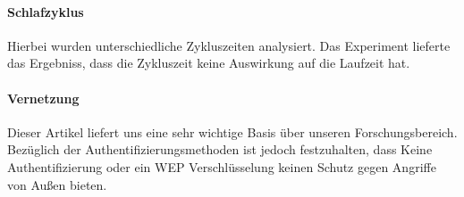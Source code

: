 \documentclass{report}
\begin{document}
\paragraph{Schlafzyklus} Hierbei wurden unterschiedliche Zykluszeiten analysiert.
Das Experiment lieferte das Ergebniss, dass die Zykluszeit keine Auswirkung auf die Laufzeit hat.

\paragraph{Vernetzung} Dieser Artikel liefert uns eine sehr wichtige Basis über unseren Forschungsbereich. Bezüglich der Authentifizierungsmethoden ist jedoch festzuhalten, dass Keine Authentifizierung oder ein WEP Verschlüsselung keinen Schutz gegen Angriffe von Außen bieten.
\end{document}
